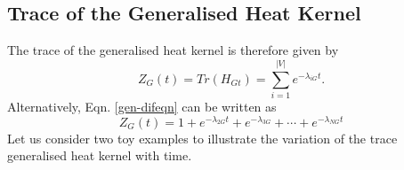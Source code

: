 \documentclass[10pt,a4paper]{article}
\begin{document}
        \subsection{Trace of the Generalised Heat Kernel}
        The trace of the generalised heat kernel is therefore given by
        \begin{equation}
        Z_{G}(t) = Tr(H_{Gt}) = \sum_{i=1}^{|V|} e^{-\lambda_{iG} t}.
        \label{Genkerneltrace}
        \end{equation}
        Alternatively, Eqn. \ref{gen-difeqn} can be written as 
        \begin{equation}
        Z_{G}(t) =  1+ e^{-\lambda_{2G} t} + e^{-\lambda_{3G}} + \cdots + e^{-\lambda_{NG} t}
        \end{equation}
        Let us consider two toy examples to illustrate the variation of the trace generalised heat kernel with time.
\end{document}
